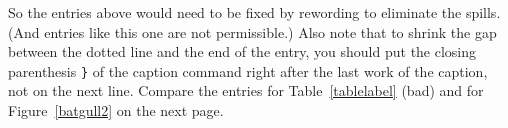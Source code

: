 
\begin{singlespace}
\renewcommand{\cftbeforetoctitleskip}{.6in}
\renewcommand{\cftaftertoctitleskip}{1em}
\renewcommand{\contentsname}{TABLE OF CONTENTS}
\renewcommand{\cfttoctitlefont}{\hfill\large\bfseries}
\renewcommand{\cftaftertoctitle}{\hfill}
\renewcommand{\cftchapfont}{\cftsecfont}
\renewcommand{\cftchapdotsep}{\cftsecdotsep}
\renewcommand{\cftchapleader}{\normalfont\cftdotfill{\cftsecdotsep}}
\renewcommand{\cftchappagefont}{\normalfont}
\setlength{\cftparskip}{1.0\baselineskip}%
\tableofcontents





\newpage
{} %
\renewcommand{\cftbeforelottitleskip}{.6in}
\renewcommand{\cftafterlottitleskip}{1em}
\renewcommand{\listtablename}{LIST OF TABLES}
\renewcommand{\cftlottitlefont}{\hfill\large\bfseries}
\renewcommand{\cftafterlottitle}{\hfill}

\setlength{\cftparskip}{1.0\baselineskip}
\renewcommand{\cfttabpresnum}{Table~}

\newlength{\mylenTable}
\settowidth{\mylenTable}{\cfttabpresnum\cfttabaftersnum}

\listoftables

\vspace{12pt}
\noindent So the entries above would need to be fixed by
rewording to eliminate the spills.
(And entries like this one are not permissible.)
\noindent Also note that to
shrink the gap between the dotted line and the
end of the entry, you should put the closing parenthesis
\verb+}+ of the caption command right after the last work of the
caption, not on the next line. Compare the entries for
Table~\ref{tablelabel} (bad)
and for Figure~\ref{batgull2} on the next page.


\end{singlespace}
